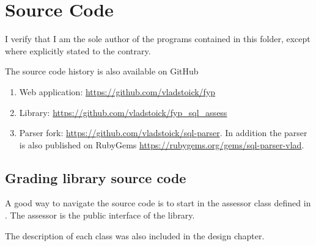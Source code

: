 \chapter{Source Code}

I verify that I am the sole author of the programs contained in this folder, except where explicitly stated to the contrary.

The source code history is also available on GitHub
\begin{enumerate}
    \item Web application: \url{https://github.com/vladstoick/fyp}
    \item Library: \url{https://github.com/vladstoick/fyp_sql_assess}
    \item Parser fork: \url{https://github.com/vladstoick/sql-parser}. In addition the parser is also published on RubyGems \url{https://rubygems.org/gems/sql-parser-vlad}.
\end{enumerate}

\section{Grading library source code}

A good way to navigate the source code is to start in the assessor class defined in . The assessor is the public interface of the library.

The description of each class was also included in the design chapter.

